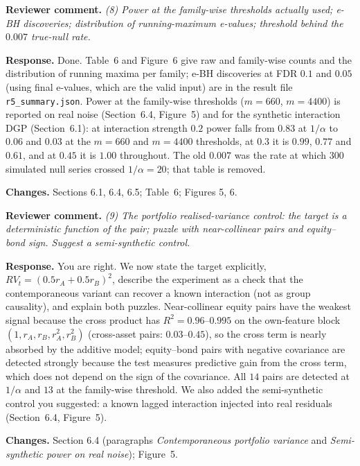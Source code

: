 \documentclass[11pt,a4paper]{article}
\newcommand{\rev}[1]{\par\noindent\textbf{Reviewer comment.} \emph{#1}}
\newcommand{\resp}{\par\noindent\textbf{Response.} }
\newcommand{\chg}{\par\noindent\textbf{Changes.} }
\begin{document}
\rev{(8) Power at the family-wise thresholds actually used; e-BH discoveries; distribution of running-maximum e-values; threshold behind the $0.007$ true-null rate.}
\resp Done. Table~6 and Figure~6 give raw and family-wise counts and the distribution of running maxima per family; e-BH discoveries at FDR $0.1$ and $0.05$ (using final e-values, which are the valid input) are in the result file \texttt{r5\_summary.json}. Power at the family-wise thresholds ($m=660$, $m=4400$) is reported on real noise (Section~6.4, Figure~5) and for the synthetic interaction DGP (Section~6.1): at interaction strength $0.2$ power falls from $0.83$ at $1/\alpha$ to $0.06$ and $0.03$ at the $m=660$ and $m=4400$ thresholds, at $0.3$ it is $0.99$, $0.77$ and $0.61$, and at $0.45$ it is $1.00$ throughout. The old $0.007$ was the rate at which $300$ simulated null series crossed $1/\alpha=20$; that table is removed.
\chg Sections 6.1, 6.4, 6.5; Table~6; Figures 5, 6.

\rev{(9) The portfolio realised-variance control: the target is a deterministic function of the pair; puzzle with near-collinear pairs and equity--bond sign. Suggest a semi-synthetic control.}
\resp You are right. We now state the target explicitly, $RV_t=(0.5r_A+0.5r_B)^2$, describe the experiment as a check that the contemporaneous variant can recover a known interaction (not as group causality), and explain both puzzles. Near-collinear equity pairs have the weakest signal because the cross product has $R^2=0.96$--$0.995$ on the own-feature block $(1,r_A,r_B,r_A^2,r_B^2)$ (cross-asset pairs: $0.03$--$0.45$), so the cross term is nearly absorbed by the additive model; equity--bond pairs with negative covariance are detected strongly because the test measures predictive gain from the cross term, which does not depend on the sign of the covariance. All $14$ pairs are detected at $1/\alpha$ and $13$ at the family-wise threshold. We also added the semi-synthetic control you suggested: a known lagged interaction injected into real residuals (Section~6.4, Figure~5).
\chg Section 6.4 (paragraphs \emph{Contemporaneous portfolio variance} and \emph{Semi-synthetic power on real noise}); Figure~5.
\end{document}
